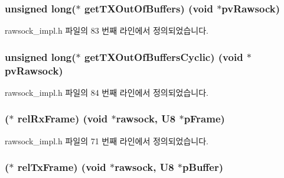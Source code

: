 \subsubsection[{\texorpdfstring{get\+T\+X\+Out\+Of\+Buffers}{getTXOutOfBuffers}}]{\setlength{\rightskip}{0pt plus 5cm}unsigned long($\ast$ get\+T\+X\+Out\+Of\+Buffers) (void $\ast$pv\+Rawsock)}\hypertarget{structrawsock__cb__t_a224915eda51e77d90c9e53bad4bd3ee9}{}\label{structrawsock__cb__t_a224915eda51e77d90c9e53bad4bd3ee9}


rawsock\+\_\+impl.\+h 파일의 83 번째 라인에서 정의되었습니다.

\subsubsection[{\texorpdfstring{get\+T\+X\+Out\+Of\+Buffers\+Cyclic}{getTXOutOfBuffersCyclic}}]{\setlength{\rightskip}{0pt plus 5cm}unsigned long($\ast$ get\+T\+X\+Out\+Of\+Buffers\+Cyclic) (void $\ast$pv\+Rawsock)}\hypertarget{structrawsock__cb__t_a1551298f6cf98c1bee5479535d90e893}{}\label{structrawsock__cb__t_a1551298f6cf98c1bee5479535d90e893}


rawsock\+\_\+impl.\+h 파일의 84 번째 라인에서 정의되었습니다.

\subsubsection[{\texorpdfstring{rel\+Rx\+Frame}{relRxFrame}}]{($\ast$ rel\+Rx\+Frame) (void $\ast$rawsock, {\bf U8} $\ast$p\+Frame)}\hypertarget{structrawsock__cb__t_a428063ea57178d7db91ee180d7028101}{}\label{structrawsock__cb__t_a428063ea57178d7db91ee180d7028101}


rawsock\+\_\+impl.\+h 파일의 71 번째 라인에서 정의되었습니다.

\subsubsection[{\texorpdfstring{rel\+Tx\+Frame}{relTxFrame}}]{($\ast$ rel\+Tx\+Frame) (void $\ast$rawsock, {\bf U8} $\ast$p\+Buffer)}\hypertarget{structrawsock__cb__t_a271ab89bbfda02e12adfcdc727c2d5e2}{}\label{structrawsock__cb__t_a271ab89bbfda02e12adfcdc727c2d5e2}


